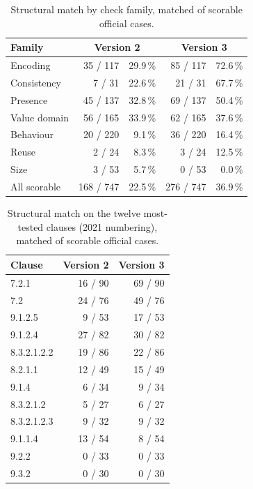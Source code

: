 \begin{table}[t]
  \centering
  \caption{Structural match by check family, matched of scorable official
    cases.}
  \label{tab:families}
  \begin{tabular}{lrrrr}
    \toprule
    Family & \multicolumn{2}{c}{Version 2} & \multicolumn{2}{c}{Version 3} \\
    \midrule
    Encoding     & 35 / 117 & 29.9\,\% & 85 / 117 & 72.6\,\% \\
    Consistency  & 7 / 31   & 22.6\,\% & 21 / 31  & 67.7\,\% \\
    Presence     & 45 / 137 & 32.8\,\% & 69 / 137 & 50.4\,\% \\
    Value domain & 56 / 165 & 33.9\,\% & 62 / 165 & 37.6\,\% \\
    Behaviour    & 20 / 220 & 9.1\,\%  & 36 / 220 & 16.4\,\% \\
    Reuse        & 2 / 24   & 8.3\,\%  & 3 / 24   & 12.5\,\% \\
    Size         & 3 / 53   & 5.7\,\%  & 0 / 53   & 0.0\,\% \\
    \midrule
    All scorable & 168 / 747 & 22.5\,\% & 276 / 747 & 36.9\,\% \\
    \bottomrule
  \end{tabular}
\end{table}

\begin{table}[t]
  \centering
  \caption{Structural match on the twelve most-tested clauses (2021
    numbering), matched of scorable official cases.}
  \label{tab:clauses}
  \begin{tabular}{lrr}
    \toprule
    Clause & Version 2 & Version 3 \\
    \midrule
    7.2.1       & 16 / 90 & 69 / 90 \\
    7.2         & 24 / 76 & 49 / 76 \\
    9.1.2.5     & 9 / 53  & 17 / 53 \\
    9.1.2.4     & 27 / 82 & 30 / 82 \\
    8.3.2.1.2.2 & 19 / 86 & 22 / 86 \\
    8.2.1.1     & 12 / 49 & 15 / 49 \\
    9.1.4       & 6 / 34  & 9 / 34 \\
    8.3.2.1.2   & 5 / 27  & 6 / 27 \\
    8.3.2.1.2.3 & 9 / 32  & 9 / 32 \\
    9.1.1.4     & 13 / 54 & 8 / 54 \\
    9.2.2       & 0 / 33  & 0 / 33 \\
    9.3.2       & 0 / 30  & 0 / 30 \\
    \bottomrule
  \end{tabular}
\end{table}

